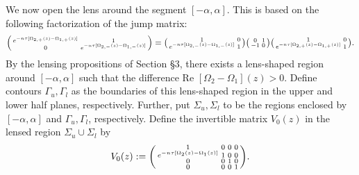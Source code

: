 \documentclass[usenames,dvipsnames]{article}
\theoremstyle{definition}
\numberwithin{equation}{section}
\numberwithin{figure}{section}
\begin{document}
We now open the lens around the segment $[-\alpha,\alpha]$. This is based on the following factorization of the jump matrix:
\begin{equation*}
    \begin{psmallmatrix}
        e^{-n\tau[\Omega_{2,+}(z)-\Omega_{1,+}(z)]} & 1\\
        0 & e^{-n\tau[\Omega_{2,-}(z)-\Omega_{1,-}(z)]}
    \end{psmallmatrix}
    =\begin{psmallmatrix}
        1 & 0\\
        e^{-n\tau[\Omega_{2,-}(z)-\Omega_{1,-}(z)]} & 1
    \end{psmallmatrix}
    \begin{psmallmatrix}
        0 & 1\\
       -1 & 0\\
    \end{psmallmatrix}
    \begin{psmallmatrix}
        1 & 0\\
        e^{-n\tau[\Omega_{2,+}(z)-\Omega_{1,+}(z)]} & 1\\
    \end{psmallmatrix}.
\end{equation*}
By the lensing propositions of Section \S3, there exists a lens-shaped region around $[-\alpha,\alpha]$ such that the difference $\text{Re }[\Omega_2 -\Omega_1](z) >0$. Define contours $\Gamma_u,\Gamma_l$ as the boundaries of this lens-shaped region in the upper and lower half planes, respectively. Further, put $\Sigma_u, \Sigma_l$ to be the regions enclosed by $[-\alpha,\alpha]$ and $\Gamma_u,\Gamma_l$, respectively.
Define the invertible matrix $V_0(z)$ in the lensed region $\Sigma_u \cup \Sigma_l$ by
    \begin{equation}
        V_0(z) := \begin{psmallmatrix}
        1 & 0 & 0 & 0\\
        e^{-n\tau[\Omega_{2}(z)-\Omega_{1}(z)]} & 1 & 0 & 0\\
        0 & 0 & 1 & 0 \\
        0 & 0 & 0 & 1
    \end{psmallmatrix}.
    \end{equation}
\end{document}
